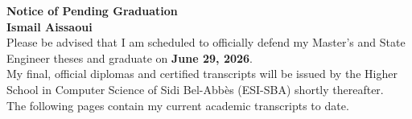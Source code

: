 \documentclass[11pt, a4paper]{article}
\begin{document}
\thispagestyle{empty}
\vspace*{5cm}

\begin{center}
    \LARGE \textbf{Notice of Pending Graduation} \\
    \vspace{1cm}
    \large \textbf{Ismail Aissaoui} \\
    \vspace{0.5cm}
    \normalsize
    Please be advised that I am scheduled to officially defend my Master's and State Engineer theses and graduate on \textbf{June 29, 2026}. \\
    \vspace{0.5cm}
    My final, official diplomas and certified transcripts will be issued by the Higher School in Computer Science of Sidi Bel-Abbès (ESI-SBA) shortly thereafter. \\
    \vspace{0.5cm}
    The following pages contain my current academic transcripts to date.
\end{center}
\end{document}

